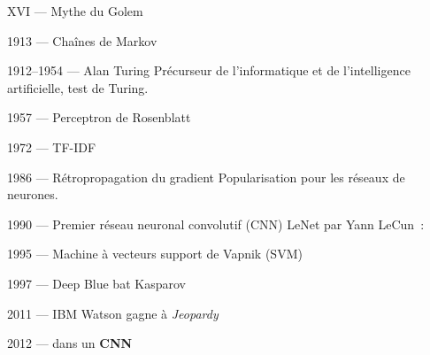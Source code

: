 \begin{frame}{XVI\ieme{} --- Mythe du Golem}
\end{frame}

\begin{frame}{1913 --- Chaînes de Markov}
\end{frame}

\begin{frame}{1912--1954 --- Alan Turing}
  Précurseur de l'informatique et de l'intelligence artificielle, test de Turing.

\end{frame}

\begin{frame}{1957 --- Perceptron de Rosenblatt}
\end{frame}

\begin{frame}{1972 --- TF-IDF}
\end{frame}

\begin{frame}{1986 --- Rétropropagation du gradient}
  Popularisation pour les réseaux de neurones.

\end{frame}

\begin{frame}{1990 --- Premier réseau neuronal convolutif (CNN)}
  LeNet par Yann LeCun~:
\end{frame}

\begin{frame}{1995 --- Machine à vecteurs support de Vapnik (SVM)}
\end{frame}

\begin{frame}{1997 --- Deep Blue bat Kasparov}
\end{frame}

\begin{frame}{2011 --- IBM Watson gagne à \textit{Jeopardy}}
\end{frame}

\begin{frame}{2012 ---  dans un \textbf{CNN}}
\end{frame}

